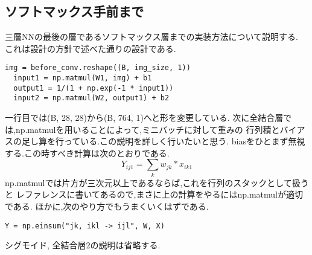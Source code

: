 \documentclass[a4paper,11pt]{jsarticle}
\begin{document}
\subsection*{ソフトマックス手前まで}
三層NNの最後の層であるソフトマックス層までの実装方法について説明する.
これは設計の方針で述べた通りの設計である.
\begin{lstlisting}[caption=伝播1]
  img = before_conv.reshape((B, img_size, 1))
  input1 = np.matmul(W1, img) + b1
  output1 = 1/(1 + np.exp(-1 * input1))
  input2 = np.matmul(W2, output1) + b2
\end{lstlisting}
一行目では(B, 28, 28)から(B, 764, 1)へと形を変更している.
次に全結合層では,np.matmulを用いることによって,ミニバッチに対して重みの
行列積とバイアスの足し算を行っている.この説明を詳しく行いたいと思う.
biasをひとまず無視する.この時すべき計算は次のとおりである.
$$Y_{ij1} = \sum_{k} w_{jk} * x_{ik1}$$
np.matmulでは片方が三次元以上であるならば,これを行列のスタックとして扱うと
レファレンスに書いてあるので,まさに上の計算をやるにはnp.matmulが適切である.
ほかに,次のやり方でもうまくいくはずである.
\begin{lstlisting}[caption=別解]
  Y = np.einsum("jk, ikl -> ijl", W, X)
\end{lstlisting}
シグモイド, 全結合層2の説明は省略する.
\end{document}

